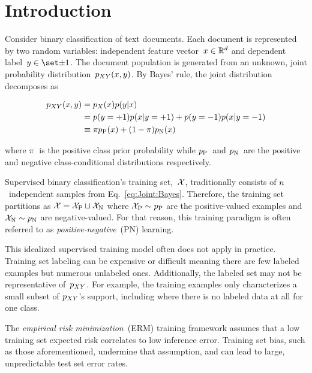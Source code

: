 \documentclass[]{subfiles}
\begin{document}
\section{Introduction}\label{sec:Introduction}

Consider binary classification of text documents.  Each document is represented by two random variables: independent feature vector~${x \in \mathbb{R}^{d}}$ and dependent label~${\y \in \domainY}$. The document population is generated from an unknown, joint probability distribution~${p_{XY}(x,y)}$.  By Bayes' rule, the joint distribution decomposes as

\begin{align}
    p_{XY}(x,y) &= p_{X}(x) p(y \vert x) \label{eq:TrainDist} \\
                  &= p(y = {+}1) p(x \vert y = {+}1) + p(y = {-}1) p(x \vert y = {-}1) \nonumber\\
                  &\equiv \pi p_{\textnormal{P}}(x) + (1 - \pi) p_{\textnormal{N}}(x) \label{eq:Joint:Bayes}
\end{align}

\noindent
where $\pi$~is the positive class prior probability while $p_{\textnormal{P}}$~and $p_{\textnormal{N}}$~are the positive and negative class-conditional distributions respectively.

Supervised binary classification's training set,~$\mathcal{X}$, traditionally consists of $n$~independent samples from Eq.~\eqref{eq:Joint:Bayes}.  Therefore, the training set partitions as ${\mathcal{X} = \mathcal{X}_{\textnormal{P}} \sqcup \mathcal{X}_{\textnormal{N}}}$ where ${\mathcal{X}_{\textnormal{P}} \sim p_{\textnormal{P}}}$ are the positive-valued examples and ${\mathcal{X}_{\textnormal{N}} \sim p_{\textnormal{N}}}$ are negative-valued.  For that reason, this training paradigm is often referred to as \textit{positive-negative}~(PN) learning.

This idealized supervised training model often does not apply in practice.  Training set labeling can be expensive or difficult meaning there are few labeled examples but numerous unlabeled ones.  Additionally, the labeled set may not be representative of~$p_{XY}$.  For example, the training examples only characterizes a small subset of $p_{XY}$'s support, including where there is no labeled data at all for one class.

The \textit{empirical risk minimization}~(ERM) training framework assumes that a low training set expected risk correlates to low inference error. Training set bias, such as those aforementioned, undermine that assumption, and can lead to large, unpredictable test set error rates.
\end{document}
